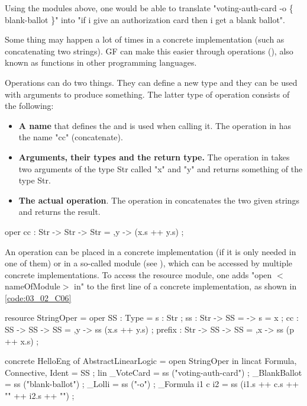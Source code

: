 Using the modules above, one would be able to translate "voting-auth-card -o \{ blank-ballot \}" into "if i give an authorization card then i get a blank ballot".

Some thing may happen a lot of times in a concrete implementation (such as concatenating two strings). GF can make this easier through operations (), also known as functions in other programming languages. 

Operations can do two things. They can define a new type and they can be used with arguments to produce something. The latter type of operation consists of the following:
\begin{itemize}
\item \textbf{A name} that defines the  and is used when calling it. The operation in  has the name "cc" (concatenate).

\item \textbf{Arguments, their types and the return type.} The operation in  takes two arguments of the type Str called "x" and "y" and returns something of the type Str.

\item \textbf{The actual operation}. The operation in  concatenates the two given strings and returns the result.
\end{itemize}

\begin{lstgf}
oper 
    cc : Str -> Str -> Str = \x,y -> (x.s ++ y.s) ;
\end{lstgf}

An operation can be placed in a concrete implementation (if it is only needed in one of them) or in a so-called  module (see ), which can be accessed by multiple concrete implementations. To access the resource module, one adds "open $<$nameOfModule$>$ in" to the first line of a concrete implementation, as shown in \ref{code:03_02_C06}

\begin{lstgf}
resource StringOper = {
    oper
        SS : Type = {s : Str} ;
        ss : Str -> SS = \x -> {s = x} ;
        cc : SS -> SS -> SS = \x,y -> ss (x.s ++ y.s) ;
        prefix : Str -> SS -> SS = \p,x -> ss (p ++ x.s) ;
}
\end{lstgf}

\begin{lstgf}
concrete HelloEng of AbstractLinearLogic = open StringOper in {
    lincat 
        Formula, Connective, Ident = SS ;
    lin 
        _VoteCard = ss ("voting-auth-card") ;
        _BlankBallot = ss ("blank-ballot") ;
        _Lolli = ss ("-o") ;
        _Formula i1 c i2 = ss (i1.s ++ c.s ++ "{" ++ i2.s ++ "}") ;
}
\end{lstgf}

